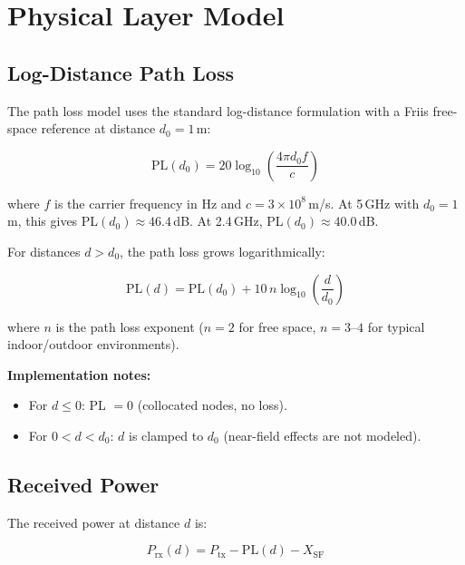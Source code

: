 \documentclass[11pt,letterpaper]{article}
\begin{document}
\section{Physical Layer Model}
\label{sec:phy}

\subsection{Log-Distance Path Loss}
\label{sec:pathloss}

The path loss model uses the standard log-distance formulation with a
Friis free-space reference at distance $d_0 = 1$\,m:

\begin{equation}
\label{eq:friis}
\text{PL}(d_0) = 20 \log_{10}\!\left(\frac{4\pi d_0 f}{c}\right)
\end{equation}

where $f$ is the carrier frequency in Hz and $c = 3 \times 10^8$\,m/s.  At
5\,GHz with $d_0 = 1$\,m, this gives PL$(d_0) \approx 46.4$\,dB.  At
2.4\,GHz, PL$(d_0) \approx 40.0$\,dB.

For distances $d > d_0$, the path loss grows logarithmically:

\begin{equation}
\label{eq:pathloss}
\text{PL}(d) = \text{PL}(d_0) + 10\,n \log_{10}\!\left(\frac{d}{d_0}\right)
\end{equation}

where $n$ is the path loss exponent ($n = 2$ for free space, $n = 3$--$4$ for
typical indoor/outdoor environments).

\textbf{Implementation notes:}
\begin{itemize}[itemsep=2pt]
\item For $d \leq 0$: PL $= 0$ (collocated nodes, no loss).
\item For $0 < d < d_0$: $d$ is clamped to $d_0$ (near-field effects are not modeled).
\end{itemize}

\subsection{Received Power}
\label{sec:rxpower}

The received power at distance $d$ is:

\begin{equation}
\label{eq:rxpower}
P_\text{rx}(d) = P_\text{tx} - \text{PL}(d) - X_\text{SF}
\end{equation}
\end{document}
